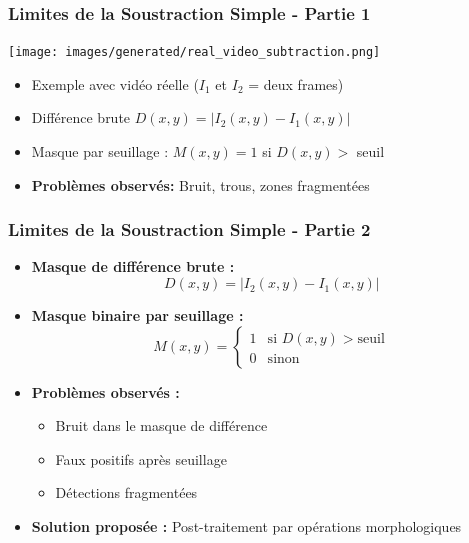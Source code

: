 \documentclass{beamer}
\begin{document}
\begin{frame}
    \frametitle{Limites de la Soustraction Simple - Partie 1}
    \begin{center}
        \texttt{[image: images/generated/real\_video\_subtraction.png]}
    \end{center}
    \begin{itemize}
        \item Exemple avec vidéo réelle ($I_{1}$ et $I_{2}$ = deux frames)
        \item Différence brute $D(x,y) = |I_{2}(x,y) - I_{1}(x,y)|$
        \item Masque par seuillage : $M(x,y) = 1$ si $D(x,y) >$ seuil
        \item \textbf{Problèmes observés:} Bruit, trous, zones fragmentées
    \end{itemize}
\end{frame}

\begin{frame}
    \frametitle{Limites de la Soustraction Simple - Partie 2}
    \begin{itemize}
        \item \textbf{Masque de différence brute :}
        \begin{equation*}
            D(x,y) = |I_2(x,y) - I_1(x,y)|
        \end{equation*}
        \item \textbf{Masque binaire par seuillage :}
        \begin{equation*}
            M(x,y) = \begin{cases}
                1 & \text{si } D(x,y) > \text{seuil} \\
                0 & \text{sinon}
            \end{cases}
        \end{equation*}
        \item \textbf{Problèmes observés :}
        \begin{itemize}
            \item Bruit dans le masque de différence
            \item Faux positifs après seuillage
            \item Détections fragmentées
        \end{itemize}
        \item \textbf{Solution proposée :} Post-traitement par opérations morphologiques
    \end{itemize}
\end{frame}
\end{document}

